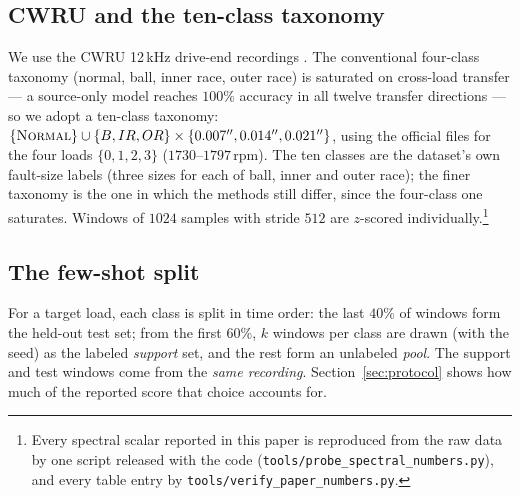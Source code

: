 \documentclass[preprint,12pt]{elsarticle}
\begin{document}
\subsection{CWRU and the ten-class taxonomy}
We use the CWRU 12\,kHz drive-end recordings \cite{smith2015cwru}. The
conventional four-class
taxonomy (normal, ball, inner race, outer race) is saturated on cross-load
transfer --- a source-only model reaches $100\%$ accuracy in all twelve
transfer directions --- so we adopt a ten-class taxonomy:
$\{\textsc{Normal}\} \cup \{B,IR,OR\} \times \{0.007'', 0.014'', 0.021''\}$,
using the official files for the four loads $\{0,1,2,3\}$
($1730$--$1797$\,rpm). The ten classes are the dataset's own fault-size labels
(three sizes for each of ball, inner and outer race); the finer taxonomy is the
one in which the methods still differ, since the four-class one saturates.
Windows of $1024$ samples with stride $512$ are $z$-scored individually.\footnote{Every spectral scalar reported in this paper
is reproduced from the raw data by one script released with the code
(\texttt{tools/probe\_spectral\_numbers.py}), and every table entry by
\texttt{tools/verify\_paper\_numbers.py}.}

\subsection{The few-shot split}
For a target load, each class is split in time order: the last $40\%$ of
windows form the held-out test set; from the first $60\%$, $k$ windows per
class are drawn (with the seed) as the labeled \emph{support} set, and the rest
form an unlabeled \emph{pool}. The support and test windows come
from the \emph{same recording}. Section~\ref{sec:protocol} shows how much of
the reported score that choice accounts for.
\end{document}
